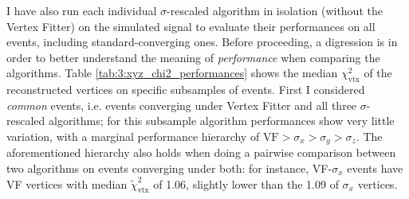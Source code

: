 I have also run each individual $\sigma$-rescaled algorithm in isolation (without the Vertex Fitter) on the simulated signal to evaluate their performances on all events, including standard-converging ones.
Before proceeding, a digression is in order to better understand the meaning of \textit{performance} when comparing the algorithms.
Table \ref{tab:3:xyz_chi2_performances} shows the median $\chi^2_\text{vtx}$ of the reconstructed vertices on specific subsamples of events.
First I considered \textit{common} events, i.e. events converging under Vertex Fitter and all three $\sigma$-rescaled algorithms;
for this subsample algorithm performances show very little variation, with a marginal performance hierarchy of $\text{VF} > \sigma_x > \sigma_y > \sigma_z$.
The aforementioned hierarchy also holds when doing a pairwise comparison between two algorithms on events converging under both:
for instance, VF-$\sigma_x$ events have VF vertices with median $\tilde{\chi}^2_\text{vtx}$ of 1.06, slightly lower than the 1.09 of $\sigma_x$ vertices.

